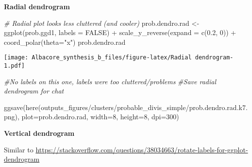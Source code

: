 \documentclass[
]{article}
\newenvironment{Shaded}{\begin{snugshade}}{\end{snugshade}}
\newcommand{\AttributeTok}[1]{\textcolor[rgb]{0.77,0.63,0.00}{#1}}
\newcommand{\CommentTok}[1]{\textcolor[rgb]{0.56,0.35,0.01}{\textit{#1}}}
\newcommand{\ConstantTok}[1]{\textcolor[rgb]{0.00,0.00,0.00}{#1}}
\newcommand{\DecValTok}[1]{\textcolor[rgb]{0.00,0.00,0.81}{#1}}
\newcommand{\FloatTok}[1]{\textcolor[rgb]{0.00,0.00,0.81}{#1}}
\newcommand{\FunctionTok}[1]{\textcolor[rgb]{0.00,0.00,0.00}{#1}}
\newcommand{\NormalTok}[1]{#1}
\newcommand{\OtherTok}[1]{\textcolor[rgb]{0.56,0.35,0.01}{#1}}
\newcommand{\SpecialCharTok}[1]{\textcolor[rgb]{0.00,0.00,0.00}{#1}}
\newcommand{\StringTok}[1]{\textcolor[rgb]{0.31,0.60,0.02}{#1}}
\begin{document}
\textbf{Radial dendrogram}

\begin{Shaded}
\begin{Highlighting}[]
\CommentTok{\# Radial plot looks less cluttered (and cooler)}
\NormalTok{prob.dendro.rad }\OtherTok{\textless{}{-}} \FunctionTok{ggplot}\NormalTok{(prob.ggd1, }\AttributeTok{labels =} \ConstantTok{FALSE}\NormalTok{) }\SpecialCharTok{+} 
  \FunctionTok{scale\_y\_reverse}\NormalTok{(}\AttributeTok{expand =} \FunctionTok{c}\NormalTok{(}\FloatTok{0.2}\NormalTok{, }\DecValTok{0}\NormalTok{)) }\SpecialCharTok{+}
  \FunctionTok{coord\_polar}\NormalTok{(}\AttributeTok{theta=}\StringTok{"x"}\NormalTok{)}
\NormalTok{prob.dendro.rad }
\end{Highlighting}
\end{Shaded}

\texttt{[image: Albacore\_synthesis\_b\_files/figure-latex/Radial dendrogram-1.pdf]}

\begin{Shaded}
\begin{Highlighting}[]
\CommentTok{\#No labels on this one, labels were too cluttered/problems}
\CommentTok{\#Save radial dendrogram for chat}

\FunctionTok{ggsave}\NormalTok{(}\FunctionTok{here}\NormalTok{(}\StringTok{\textquotesingle{}outputs\_figures/clusters/probable\_divis\_simple/prob.dendro.rad.k7.png\textquotesingle{}}\NormalTok{), }\AttributeTok{plot=}\NormalTok{prob.dendro.rad, }\AttributeTok{width=}\DecValTok{8}\NormalTok{, }\AttributeTok{height=}\DecValTok{8}\NormalTok{, }\AttributeTok{dpi=}\DecValTok{300}\NormalTok{)}
\end{Highlighting}
\end{Shaded}

\textbf{Vertical dendrogram}

Similar to
\url{https://stackoverflow.com/questions/38034663/rotate-labels-for-ggplot-dendrogram}
\end{document}
